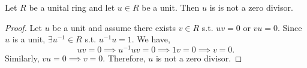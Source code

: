 \begin{theorem}
  Let $R$ be a unital ring and let $u\in R$ be a unit. 
  Then $u$ is is not a zero divisor.
  \label{thm:unitZero}
\end{theorem}
\begin{proof}
  Let $u$ be a unit and assume there exists $v\in R$ s.t. $uv=0$ or $vu=0$. Since $u$ is a unit, $\exists u^{-1} \in R$ s.t. $u^{-1} u=1$. We have,
  $$uv=0 \implies u^{-1}uv=0\implies 1v=0 \implies v=0.$$ Similarly, $vu=0 \implies v=0$. Therefore, $u$ is not a zero divisor.
\end{proof}